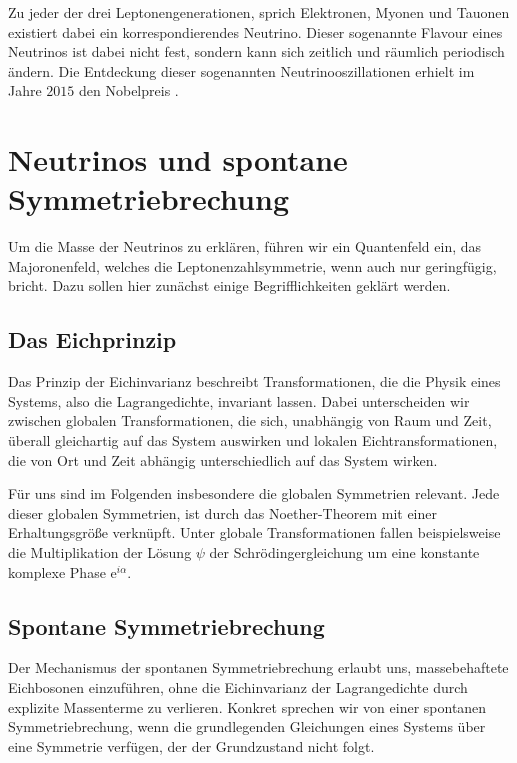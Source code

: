 Zu jeder der drei Leptonengenerationen, sprich Elektronen, Myonen und Tauonen existiert dabei ein korrespondierendes Neutrino.
Dieser sogenannte Flavour eines Neutrinos ist dabei nicht fest, sondern kann sich zeitlich und räumlich periodisch ändern.
Die Entdeckung dieser sogenannten Neutrinooszillationen erhielt im Jahre $2015$ den Nobelpreis \cite[S. ~19]{oberauer}.



\section{Neutrinos und spontane Symmetriebrechung}

Um die Masse der Neutrinos zu erklären, führen wir ein Quantenfeld ein, das Majoronenfeld, welches die Leptonenzahlsymmetrie, wenn auch nur geringfügig, bricht.
Dazu sollen hier zunächst einige Begrifflichkeiten geklärt werden.

\subsection{Das Eichprinzip} %

Das Prinzip der Eichinvarianz beschreibt Transformationen, die die Physik eines Systems, also die Lagrangedichte, invariant lassen.
Dabei unterscheiden wir zwischen globalen Transformationen, die sich, unabhängig von Raum und Zeit, überall gleichartig auf das System auswirken und lokalen Eichtransformationen, 
die von Ort und Zeit abhängig unterschiedlich auf das System wirken.

Für uns sind im Folgenden insbesondere die globalen Symmetrien relevant.
Jede dieser globalen Symmetrien, ist durch das Noether-Theorem mit einer Erhaltungsgröße verknüpft.
Unter globale Transformationen fallen beispielsweise die Multiplikation der Lösung $\psi$ der Schrödingergleichung um eine konstante komplexe Phase $\mathrm{e}^{i \alpha}$.

\subsection{Spontane Symmetriebrechung} %


Der Mechanismus der spontanen Symmetriebrechung erlaubt uns, massebehaftete Eichbosonen einzuführen, ohne die Eichinvarianz der Lagrangedichte durch explizite Massenterme zu verlieren.
Konkret sprechen wir von einer spontanen Symmetriebrechung, wenn die grundlegenden Gleichungen eines Systems über eine Symmetrie verfügen, der der Grundzustand nicht folgt.

